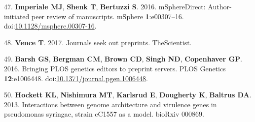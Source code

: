 \documentclass[11,]{article}
\begin{document}
47. \textbf{Imperiale MJ}, \textbf{Shenk T}, \textbf{Bertuzzi S}. 2016.
mSphereDirect: Author-initiated peer review of manuscripts. mSphere
\textbf{1}:e00307--16.
doi:\href{http://dx.doi.org/10.1128/msphere.00307-16}{10.1128/msphere.00307-16}.

48. \textbf{Vence T}. 2017. Journals seek out preprints. TheScientist.

49. \textbf{Barsh GS}, \textbf{Bergman CM}, \textbf{Brown CD},
\textbf{Singh ND}, \textbf{Copenhaver GP}. 2016. Bringing PLOS genetics
editors to preprint servers. PLOS Genetics \textbf{12}:e1006448.
doi:\href{http://dx.doi.org/10.1371/journal.pgen.1006448}{10.1371/journal.pgen.1006448}.

50. \textbf{Hockett KL}, \textbf{Nishimura MT}, \textbf{Karlsrud E},
\textbf{Dougherty K}, \textbf{Baltrus DA}. 2013. Interactions between
genome architecture and virulence genes in pseudomonas syringae, strain
cC1557 as a model. bioRxiv 000869.
\end{document}
